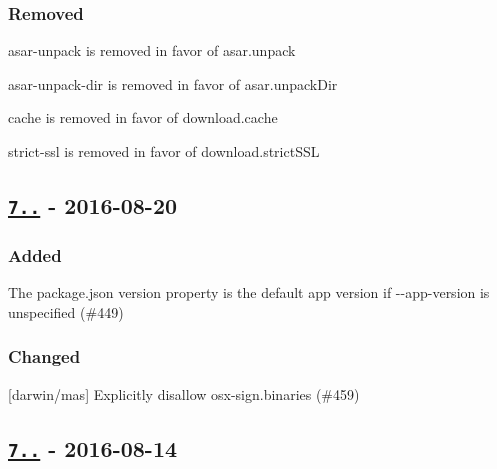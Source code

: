 \subsubsection*{Removed}


\begin{DoxyItemize}
\item {\ttfamily asar-\/unpack} is removed in favor of {\ttfamily asar.\+unpack}
\item {\ttfamily asar-\/unpack-\/dir} is removed in favor of {\ttfamily asar.\+unpack\+Dir}
\item {\ttfamily cache} is removed in favor of {\ttfamily download.\+cache}
\item {\ttfamily strict-\/ssl} is removed in favor of {\ttfamily download.\+strict\+S\+SL}
\end{DoxyItemize}

\subsection*{\href{https://github.com/electron-userland/electron-packager/compare/v7.6.0...v7.7.0}{\tt 7..} -\/ 2016-\/08-\/20}

\subsubsection*{Added}


\begin{DoxyItemize}
\item The {\ttfamily package.\+json} {\ttfamily version} property is the default app version if {\ttfamily -\/-\/app-\/version} is unspecified (\#449)
\end{DoxyItemize}

\subsubsection*{Changed}


\begin{DoxyItemize}
\item \mbox{[}darwin/mas\mbox{]} Explicitly disallow {\ttfamily osx-\/sign.\+binaries} (\#459)
\end{DoxyItemize}

\subsection*{\href{https://github.com/electron-userland/electron-packager/compare/v7.5.1...v7.6.0}{\tt 7..} -\/ 2016-\/08-\/14}

